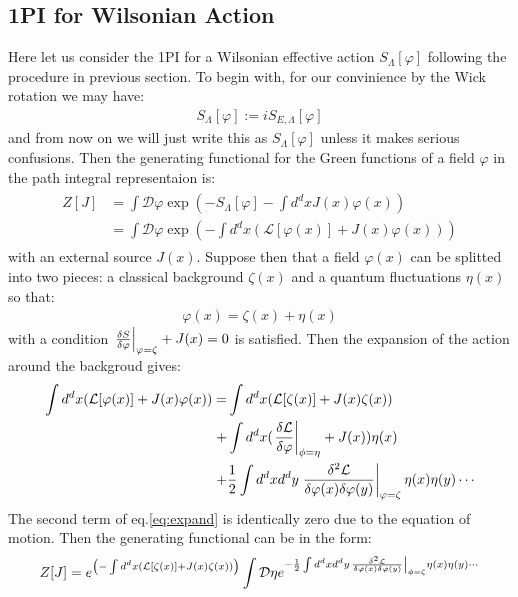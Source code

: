 \subsection{1PI for Wilsonian Action}
Here let us consider the 1PI for a Wilsonian effective action $S_{\Lambda} [\varphi]$ following the procedure in previous section. To begin with, for our convinience by the Wick rotation we may have:
\begin{align}
    S_{\Lambda}[\varphi] := iS_{E,\Lambda}[\varphi]
\end{align}
and from now on we will just write this as $S_{\Lambda}[\varphi]$ unless it makes serious confusions. Then the generating functional for the Green functions of a field $\varphi$ in the path integral representaion is:
\begin{align}
    \begin{split}
        Z[J] &= \int \mathcal{D}\varphi \exp (-S_{\Lambda} [\varphi] - \int d^{d}x J(x)\varphi(x)) \\
        & = \int \mathcal{D} \varphi \exp (-\int d^{d}x (\mathcal{L} [\varphi(x)] + J(x)\varphi(x)))
    \end{split}
\end{align}
with an external source $J(x)$. Suppose then that a field $\varphi (x)$ can be splitted into two pieces: a classical background $\zeta(x)$ and a quantum fluctuations $\eta (x)$ so that:
\begin{align}
    \varphi(x) = \zeta(x) + \eta(x)
\end{align}  
with a condition $\eval{\fdv{S}{\varphi}} _{\varphi = \zeta} + J(x) = 0$ is satisfied. Then the expansion of the action around the backgroud gives:
\begin{align}
    \label{eq:expand}
    \begin{split}
    \int d^{d} x  (\mathcal{L}[\varphi(x)] + J(x) \varphi(x) ) = & \int d^{d}x  (\mathcal{L}[\zeta(x)] + J(x)\zeta(x))  \\
    + & \int d^{d} x (\eval{\fdv{\mathcal{L}}{\varphi}} _{\phi = \eta} + J(x)) \eta(x) \\
    + & \frac{1}{2} \int d^{d}x d^{d}y \eval {\frac{\delta ^{2} \mathcal{L}}{\delta \varphi(x) \delta \varphi(y)}} _{\varphi = \zeta} \eta(x)\eta(y) \cdots 
    \end{split}
\end{align}
The second term of eq.\ref{eq:expand} is identically zero due to the equation of motion. Then the generating functional can be in the form:
\begin{align}
    Z[J] = e^ {\qty (-\int d^{d}x (\mathcal {L} [\zeta (x)] + J(x) \zeta (x)))} \int \mathcal {D} \eta e^{- \frac{1}{2} \int d^{d}x d^{d}y \eval {\frac{\delta ^{2} \mathcal{L}}{\delta \varphi(x) \delta \varphi(y)}} _{\phi = \zeta} \eta(x)\eta(y) \cdots}
\end{align}
